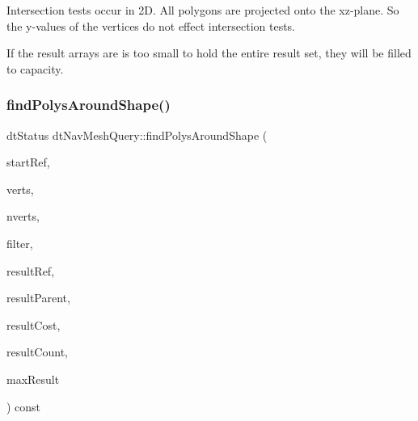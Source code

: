 Intersection tests occur in 2D. All polygons are projected onto the xz-\/plane. So the y-\/values of the vertices do not effect intersection tests.

If the result arrays are is too small to hold the entire result set, they will be filled to capacity. \mbox{\label{classdtNavMeshQuery_aa142b8c1e54bdefc39ab41507fe931d1}} 
\subsubsection{\texorpdfstring{find\+Polys\+Around\+Shape()}{findPolysAroundShape()}\hspace{0.1cm}{\footnotesize\ttfamily [2/2]}}
{\footnotesize\ttfamily dt\+Status dt\+Nav\+Mesh\+Query\+::find\+Polys\+Around\+Shape (\begin{DoxyParamCaption}\item[{\hyperlink{group__detour_gab4e0b2257a670c1a800057999612b466}{dt\+Poly\+Ref}}]{start\+Ref,  }\item[{const float $\ast$}]{verts,  }\item[{const int}]{nverts,  }\item[{const \hyperlink{classdtQueryFilter}{dt\+Query\+Filter} $\ast$}]{filter,  }\item[{\hyperlink{group__detour_gab4e0b2257a670c1a800057999612b466}{dt\+Poly\+Ref} $\ast$}]{result\+Ref,  }\item[{\hyperlink{group__detour_gab4e0b2257a670c1a800057999612b466}{dt\+Poly\+Ref} $\ast$}]{result\+Parent,  }\item[{float $\ast$}]{result\+Cost,  }\item[{int $\ast$}]{result\+Count,  }\item[{const int}]{max\+Result }\end{DoxyParamCaption}) const}

